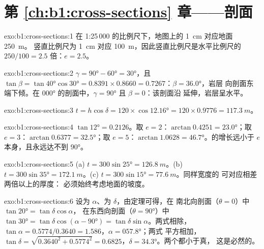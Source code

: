 \section*{第 \ref{ch:b1:cross-sections} 章——剖面}

\begin{solution}{exo:b1:cross-sections:1}
在 1:25\,000 的比例尺下，地图上的 \qty{1}{cm} 对应地面 \qty{250}{m}。
竖直比例尺为 \qty{1}{cm} 对应 \qty{100}{m}，因此竖直比例尺是水平比例尺的
$250/100 = 2.5$ 倍：$e = 2.5$。
\end{solution}

\begin{solution}{exo:b1:cross-sections:2}
$\gamma = \ang{90} - \ang{60} = \ang{30}$，且 $\tan\beta = \tan\ang{40}
\cos\ang{30} = 0.8391\times0.8660 = 0.7267$：$\beta = \ang{36.0}$，岩层
向剖面东端下倾。在
\ang{000} 的剖面中，$\gamma = \ang{90}$ 且 $\beta = 0$：该剖面沿
延伸，岩层呈水平。
\end{solution}

\begin{solution}{exo:b1:cross-sections:3}
$t = h\cos\delta = 120\times\cos\ang{12.16} = 120\times0.9776 =
\qty{117.3}{m}$。
\end{solution}

\begin{solution}{exo:b1:cross-sections:4}
$\tan\ang{12} = 0.2126$。取 $e = 2$：$\arctan 0.4251 = \ang{23.0}$；取
$e = 3$：$\arctan 0.6377 = \ang{32.5}$；取 $e = 5$：$\arctan 1.0628 =
\ang{46.7}$。的增长远小于 $e$ 本身，且永远达不到
\ang{90}。
\end{solution}

\begin{solution}{exo:b1:cross-sections:5}
(a) $t = 300\sin\ang{25} = \qty{126.8}{m}$。(b) $t = 300\sin\ang{35} =
\qty{172.1}{m}$。(c) $t = 300\sin\ang{15} = \qty{77.6}{m}$。同样宽度的
可对应相差两倍以上的厚度：
必须始终考虑地面的坡度。
\end{solution}

\begin{solution}{exo:b1:cross-sections:6}
设为 $\alpha$、为 $\delta$，由定理可得，在
南北向剖面（$\theta = 0$）中 $\tan\ang{20} = \tan\delta\cos\alpha$，
在东西向剖面（$\theta = \ang{90}$）中 $\tan\ang{30} =
\tan\delta\cos(\alpha - \ang{90}) = \tan\delta\sin\alpha$。两式相除，
$\tan\alpha = 0.5774/0.3640 = 1.586$，$\alpha = \ang{057.8}$；两式
平方相加，$\tan\delta = \sqrt{0.3640^2 + 0.5774^2} = 0.6825$，$\delta =
\ang{34.3}$。两个都小于真，
这是必然的。
\end{solution}


